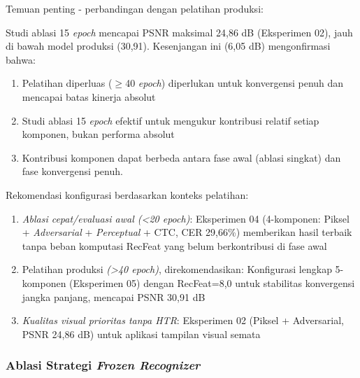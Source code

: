 Temuan penting - perbandingan dengan pelatihan produksi:

Studi ablasi 15 \textit{epoch} mencapai PSNR maksimal 24,86 dB (Eksperimen 02), jauh di bawah model produksi (30,91). Kesenjangan ini (6,05 dB) mengonfirmasi bahwa:
\begin{enumerate}[leftmargin=1.5em, labelsep=0.5em, itemindent=0pt, noitemsep, topsep=0pt, label=\alph*)]
    \item Pelatihan diperluas ($\geq$40 \textit{epoch}) diperlukan untuk konvergensi penuh dan mencapai batas kinerja absolut
    \item Studi ablasi 15 \textit{epoch} efektif untuk mengukur kontribusi relatif setiap komponen, bukan performa absolut
    \item Kontribusi komponen dapat berbeda antara fase awal (ablasi singkat) dan fase konvergensi penuh.
\end{enumerate}

Rekomendasi konfigurasi berdasarkan konteks pelatihan:
\begin{enumerate}[leftmargin=1.5em, labelsep=0.5em, itemindent=0pt, noitemsep, topsep=0pt, label=\alph*)]
    \item \textit{Ablasi cepat/evaluasi awal (<20 \textit{epoch})}: Eksperimen 04 (4-komponen: Piksel + \textit{Adversarial} + \textit{Perceptual} + CTC, CER 29,66\%) memberikan hasil terbaik tanpa beban komputasi RecFeat yang belum berkontribusi di fase awal
    \item Pelatihan produksi \textit{(>40 \textit{epoch})}, direkomendasikan: Konfigurasi lengkap 5-komponen (Eksperimen 05) dengan RecFeat=8,0 untuk stabilitas konvergensi jangka panjang, mencapai PSNR 30,91 dB
    \item \textit{Kualitas visual prioritas tanpa HTR}: Eksperimen 02 (Piksel + Adversarial, PSNR 24,86 dB) untuk aplikasi tampilan visual semata
\end{enumerate}


\subsubsection{Ablasi Strategi \textit{Frozen Recognizer}}
\label{subsubsec:kontribusi-frozen-recognizer}

